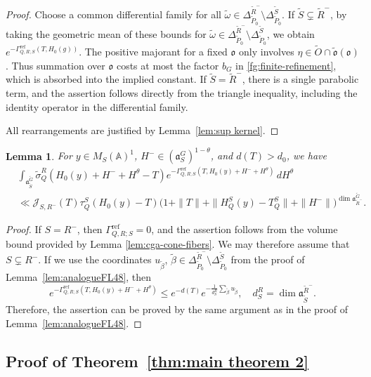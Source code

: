 \documentclass[12pt]{amsart}
\theoremstyle{definition}
\theoremstyle{plain}
\newtheorem{lemma}[definition]{Lemma}
\theoremstyle{remark}
\def\A{\mathbb{A}}%
\newcommand{\fa}{\mathfrak{a}}
\newcommand{\fo}{\mathfrak{o}}
\newcommand{\cJ}{\mathcal{J}}
\numberwithin{equation}{section}
\newcommand{\tG}{\widetilde{G}}
\newcommand{\tP}{\widetilde{P}}
\newcommand{\tR}{\widetilde{R}}
\newcommand{\tS}{\widetilde{S}}
\newcommand{\tbeta}{\widetilde{\beta}}
\newcommand{\tfo}{\widetilde{\mathfrak{o}}}
\newcommand{\tomega}{\widetilde{\omega}}
\begin{document}
\begin{proof}
Choose a common differential family for all
$\tomega\in\Delta_{\tP_0}^{\tR^-}\setminus\Delta_{\tP_0}^{\tS}$.
If $\tS\subsetneq \tR^-$, by taking the geometric mean of these bounds for $\tomega\in\Delta_{\tP_0}^{\tR^-}\setminus\Delta_{\tP_0}^{\tS}$, we obtain
$e^{-\Gamma^{\mathrm{ref}}_{Q,R;S}(T,H_0(g))}$.
The positive majorant for a fixed $\fo$ only involves
$\eta\in\widetilde O\cap\tfo(\fo)$.
Thus summation over $\fo$ costs at most the factor $b_G$
in \eqref{fg:finite-refinement}, which is absorbed into
the implied constant.
If $\tS=\tR^-$, there is a single parabolic term, and the
assertion follows directly from the triangle inequality,
including the identity operator in the differential family.

All rearrangements are justified by Lemma~\ref{lem:sup kernel}.
\end{proof}



\begin{lemma}\label{fg:cone-integral}
For $y\in M_S(\A)^1$, $H^-\in(\fa_S^G)^{1-\theta}$,
and $d(T)>d_0$, we have
\begin{align*}
 &\int_{\fa_{\tS}^{\tG}}
   \widetilde\sigma_Q^R(H_0(y)+H^-+H^\theta-T)
   e^{-\Gamma^{\mathrm{ref}}_{Q,R;S}(T,H_0(y)+H^-+H^\theta)}\,dH^\theta \\
 &\ll
   \cJ_{S,R^-}(T)\tau_Q^S(H_0(y)-T)
   \bigl(1+\|T\|+\|H_Q^S(y)-T_Q^S\|+\|H^-\|\bigr)^{\dim\fa^{\tG}_{\tR^-}}.
\end{align*}
\end{lemma}
\begin{proof}
If $S=R^{-}$, then $\Gamma^{\mathrm{ref}}_{Q,R;S}=0$, and the assertion follows from the volume bound provided by Lemma \ref{lem:cga-cone-fibers}. We may therefore assume that $S\subsetneq R^{-}$.
If we use the coordinates $u_{\tbeta}$, $\tbeta\in\Delta_{\tP_0}^{\tR^-}\setminus\Delta_{\tP_0}^{\tS}$ from the proof of
Lemma~\ref{lem:analogueFL48}, then
\begin{equation*}
 e^{-\Gamma^{\mathrm{ref}}_{Q,R;S}(T,H_0(y)+H^-+H^\theta)}
 \le e^{-d(T)}e^{-\frac{1}{d^R_S}\sum_{\tbeta} u_{\tbeta}} ,\quad d^R_S=\dim\fa_{\tS}^{\tR^-}.
\end{equation*}
Therefore, the assertion can be proved by the same argument as in the proof of Lemma~\ref{lem:analogueFL48}. 
\end{proof}


\subsection{Proof of Theorem~\ref{thm:main theorem 2}}
\end{document}
